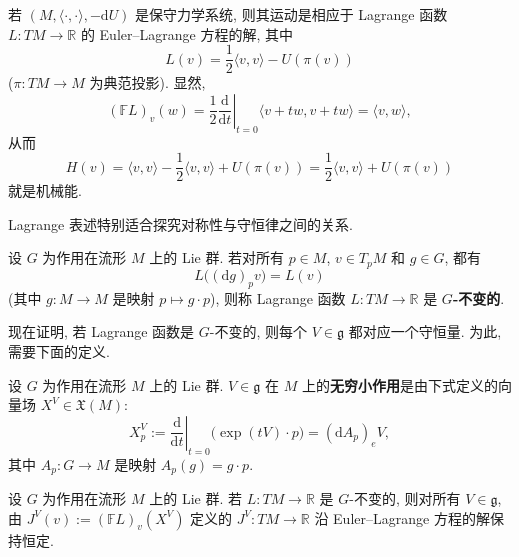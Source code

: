 \begin{RiemannExample}\label{ex:hamiltonian-as-mechanical-energy}
若 $(M,\langle\cdot,\cdot\rangle,-\mathrm{d}U)$ 是保守力学系统, 则其运动是相应于 Lagrange 函数 $L:TM\to\mathbb{R}$ 的 Euler–Lagrange 方程的解, 其中
\[
  L(v)=\frac{1}{2}\langle v,v\rangle-U(\pi(v))
\]
($\pi:TM\to M$ 为典范投影). 显然,
\[
  (\mathbb{F}L)_v(w)=\left.\frac{1}{2}\frac{\mathrm{d}}{\mathrm{d}t}\right|_{t=0}
  \langle v+tw,v+tw\rangle=\langle v,w\rangle,
\]
从而
\[
  H(v)=\langle v,v\rangle-\frac{1}{2}\langle v,v\rangle+U(\pi(v))
     =\frac{1}{2}\langle v,v\rangle+U(\pi(v))
\]
就是机械能.
\end{RiemannExample}

Lagrange 表述特别适合探究对称性与守恒律之间的关系.

\begin{RiemannDefinition}\label{def:group-invariant-lagrangian}
设 $G$ 为作用在流形 $M$ 上的 Lie 群. 若对所有 $p\in M$, $v\in T_pM$ 和 $g\in G$, 都有
\[
  L\bigl((\mathrm{d}g)_pv\bigr)=L(v)
\]
(其中 $g:M\to M$ 是映射 $p\mapsto g\cdot p$), 则称 Lagrange 函数 $L:TM\to\mathbb{R}$ 是 \textbf{$G$-不变的}.
\end{RiemannDefinition}

现在证明, 若 Lagrange 函数是 $G$-不变的, 则每个 $V\in\mathfrak{g}$ 都对应一个守恒量. 为此, 需要下面的定义.

\begin{RiemannDefinition}\label{def:infinitesimal-action-of-lie-algebra}
设 $G$ 为作用在流形 $M$ 上的 Lie 群. $V\in\mathfrak{g}$ 在 $M$ 上的\textbf{无穷小作用}是由下式定义的向量场 $X^V\in\mathfrak{X}(M)$:
\[
  X_p^V:=\left.\frac{\mathrm{d}}{\mathrm{d}t}\right|_{t=0}\bigl(\exp(tV)\cdot p\bigr)
  =(\mathrm{d}A_p)_eV,
\]
其中 $A_p:G\to M$ 是映射 $A_p(g)=g\cdot p$.
\end{RiemannDefinition}

\begin{RiemannTheorem}[Noether]\label{thm:noether-for-invariant-lagrangians}
设 $G$ 为作用在流形 $M$ 上的 Lie 群. 若 $L:TM\to\mathbb{R}$ 是 $G$-不变的, 则对所有 $V\in\mathfrak{g}$, 由 $J^V(v):=(\mathbb{F}L)_v(X^V)$ 定义的 $J^V:TM\to\mathbb{R}$ 沿 Euler–Lagrange 方程的解保持恒定.
\end{RiemannTheorem}

